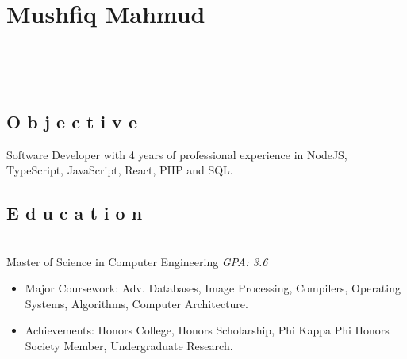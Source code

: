 \documentclass{resume}
\begin{document}
\section{Mushfiq Mahmud}

\begin{center}
	 \hspace{2mm}
	\address{Tampa, FL} \hspace{2mm}
	 \\
	\vspace{1mm}

	 \hspace{1mm}
	 \hspace{1mm}
	 \\
	\vspace{-3mm}
\end{center}


\subsection{O b j e c t i v e}
\small Software Developer with 4 years of professional experience in NodeJS, TypeScript, JavaScript, React, PHP and SQL.


\subsection{E d u c a t i o n}
 \\
Master of Science in Computer Engineering \hfill \emph{GPA: 3.6}

\begin{itemize}
\item \small Major Coursework: Adv. Databases, Image Processing, Compilers, Operating Systems, Algorithms, Computer Architecture.
\item \small Achievements: Honors College, Honors Scholarship, Phi Kappa Phi Honors Society Member, Undergraduate Research.
\end{itemize}

\end{document}
